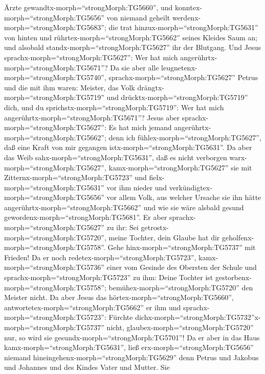 Ärzte gewandtx-morph=``strongMorph:TG5660'', und
konntex-morph=``strongMorph:TG5656'' von niemand geheilt
werdenx-morph=``strongMorph:TG5683'';  die trat
hinzux-morph=``strongMorph:TG5631'' von hinten und
rührtex-morph=``strongMorph:TG5662'' seines Kleides Saum an; und
alsobald standx-morph=``strongMorph:TG5627'' ihr der Blutgang.
 Und Jesus sprachx-morph=``strongMorph:TG5627'': Wer hat
mich angerührtx-morph=``strongMorph:TG5671''? Da sie aber alle
leugnetenx-morph=``strongMorph:TG5740'',
sprachx-morph=``strongMorph:TG5627'' Petrus und die mit ihm waren:
Meister, das Volk drängtx-morph=``strongMorph:TG5719'' und
drücktx-morph=``strongMorph:TG5719'' dich, und du
sprichstx-morph=``strongMorph:TG5719'': Wer hat mich
angerührtx-morph=``strongMorph:TG5671''?  Jesus aber
sprachx-morph=``strongMorph:TG5627'': Es hat mich jemand
angerührtx-morph=``strongMorph:TG5662''; denn ich
fühlex-morph=``strongMorph:TG5627'', daß eine Kraft von mir gegangen
istx-morph=``strongMorph:TG5631''.  Da aber das Weib
sahx-morph=``strongMorph:TG5631'', daß es nicht verborgen
warx-morph=``strongMorph:TG5627'', kamx-morph=``strongMorph:TG5627'' sie
mit Zitternx-morph=``strongMorph:TG5723'' und
fielx-morph=``strongMorph:TG5631'' vor ihm nieder und
verkündigtex-morph=``strongMorph:TG5656'' vor allem Volk, aus welcher
Ursache sie ihn hätte angerührtx-morph=``strongMorph:TG5662'' und wie
sie wäre alsbald gesund gewordenx-morph=``strongMorph:TG5681''.
 Er aber sprachx-morph=``strongMorph:TG5627'' zu ihr: Sei
getrostx-morph=``strongMorph:TG5720'', meine Tochter, dein Glaube hat
dir geholfenx-morph=``strongMorph:TG5758''. Gehe
hinx-morph=``strongMorph:TG5737'' mit Frieden!  Da er noch
redetex-morph=``strongMorph:TG5723'', kamx-morph=``strongMorph:TG5736''
einer vom Gesinde des Obersten der Schule und
sprachx-morph=``strongMorph:TG5723'' zu ihm: Deine Tochter ist
gestorbenx-morph=``strongMorph:TG5758'';
bemühex-morph=``strongMorph:TG5720'' den Meister nicht.  Da
aber Jesus das hörtex-morph=``strongMorph:TG5660'',
antwortetex-morph=``strongMorph:TG5662'' er ihm und
sprachx-morph=``strongMorph:TG5723'': Fürchte
dichx-morph=``strongMorph:TG5732''\textbar x-morph=``strongMorph:TG5737''
nicht, glaubex-morph=``strongMorph:TG5720'' nur, so wird sie
gesundx-morph=``strongMorph:TG5701''!  Da er aber in das
Haus kamx-morph=``strongMorph:TG5631'', ließ
erx-morph=``strongMorph:TG5656'' niemand
hineingehenx-morph=``strongMorph:TG5629'' denn Petrus und Jakobus und
Johannes und des Kindes Vater und Mutter.  Sie
